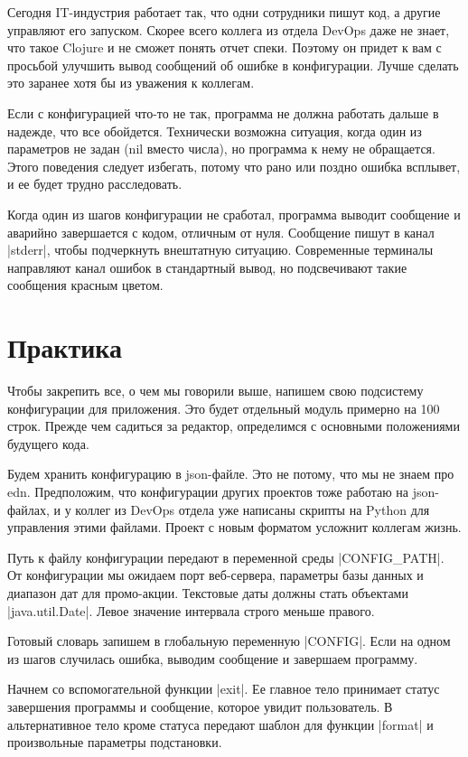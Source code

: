 Сегодня IT-индустрия работает так, что одни сотрудники пишут код, а другие
управляют его запуском. Скорее всего коллега из отдела DevOps даже не знает, что
такое Clojure и не сможет понять отчет спеки. Поэтому он придет к вам с просьбой
улучшить вывод сообщений об ошибке в конфигурации. Лучше сделать это заранее
хотя бы из уважения к коллегам.

Если с конфигурацией что-то не так, программа не должна работать дальше в
надежде, что все обойдется. Технически возможна ситуация, когда один из
параметров не задан (nil вместо числа), но программа к нему не обращается. Этого
поведения следует избегать, потому что рано или поздно ошибка всплывет, и ее
будет трудно расследовать.

Когда один из шагов конфигурации не сработал, программа выводит сообщение и
аварийно завершается с кодом, отличным от нуля. Сообщение пишут в канал
\spverb|stderr|, чтобы подчеркнуть внештатную ситуацию. Современные терминалы
направляют канал ошибок в стандартный вывод, но подсвечивают такие сообщения
красным цветом.

\section{Практика}

Чтобы закрепить все, о чем мы говорили выше, напишем свою подсистему
конфигурации для приложения. Это будет отдельный модуль примерно на 100
строк. Прежде чем садиться за редактор, определимся с основными положениями
будущего кода.

Будем хранить конфигурацию в json-файле. Это не потому, что мы не знаем про
edn. Предположим, что конфигурации других проектов тоже работаю на json-файлах,
и у коллег из DevOps отдела уже написаны скрипты на Python для управления этими
файлами. Проект с новым форматом усложнит коллегам жизнь.

Путь к файлу конфигурации передают в переменной среды \spverb|CONFIG_PATH|. От
конфигурации мы ожидаем порт веб-сервера, параметры базы данных и диапазон дат
для промо-акции. Текстовые даты должны стать объектами \spverb|java.util.Date|. Левое
значение интервала строго меньше правого.

Готовый словарь запишем в глобальную переменную \spverb|CONFIG|. Если на одном из шагов
случилась ошибка, выводим сообщение и завершаем программу.

Начнем со вспомогательной функции \spverb|exit|. Ее главное тело принимает статус
завершения программы и сообщение, которое увидит пользователь. В альтернативное
тело кроме статуса передают шаблон для функции \spverb|format| и произвольные параметры
подстановки.

